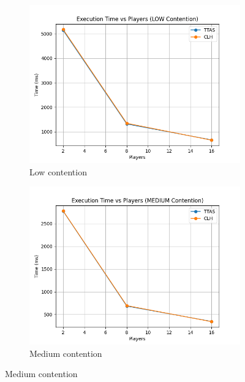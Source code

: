 \documentclass[12pt,a4paper]{article}
\begin{document}
\begin{figure}[H]
  \centering
  \begin{subfigure}{0.48\textwidth}
    \centering
    \includegraphics[width=\linewidth]{plot_time_LOW.png}
    \caption{Low contention}
    \label{fig:time-low}
  \end{subfigure}
  \hfill
  \begin{subfigure}{0.48\textwidth}
    \centering
    \includegraphics[width=\linewidth]{plot_time_MEDIUM.png}
    \caption{Medium contention}
    \label{fig:time-med}
  \end{subfigure}
  

\end{figure}
\end{document}
